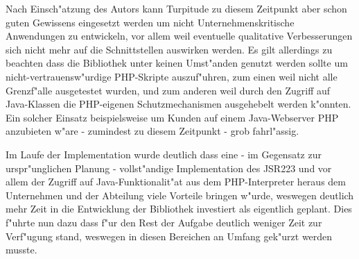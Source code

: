 Nach Einsch"atzung des Autors kann Turpitude zu diesem Zeitpunkt aber schon guten Gewissens eingesetzt werden um 
nicht Unternehmenskritische Anwendungen zu entwickeln, vor allem weil eventuelle qualitative Verbesserungen
sich nicht mehr auf die Schnittstellen auswirken werden. Es gilt allerdings zu beachten dass die Bibliothek unter
keinen Umst"anden genutzt werden sollte um nicht-vertrauensw"urdige PHP-Skripte auszuf"uhren, zum einen weil
nicht alle Grenzf"alle ausgetestet wurden, und zum anderen weil durch den Zugriff auf Java-Klassen die PHP-eigenen
Schutzmechanismen ausgehebelt werden k"onnten. Ein solcher Einsatz beispielsweise um Kunden auf einem Java-Webserver 
PHP anzubieten w"are - zumindest zu diesem Zeitpunkt - grob fahrl"assig.

Im Laufe der Implementation wurde deutlich dass eine - im Gegensatz zur urspr"unglichen Planung - vollst"andige
Implementation des JSR223 und vor allem der Zugriff auf Java-Funktionalit"at aus dem PHP-Interpreter heraus
dem Unternehmen und der Abteilung viele Vorteile bringen w"urde, weswegen
deutlich mehr Zeit in die Entwicklung der Bibliothek investiert als eigentlich geplant. Dies f"uhrte nun
dazu dass f"ur den Rest der Aufgabe deutlich weniger Zeit zur Verf"ugung stand, weswegen in diesen Bereichen an
Umfang gek"urzt werden musste.

